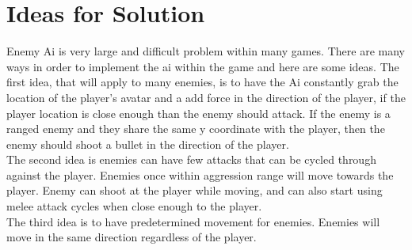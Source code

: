 \documentclass{article}
\begin{document}
	\section{Ideas for Solution}
	Enemy Ai is very large and difficult problem within many games. There are many ways in order to implement the ai within the game and here are some ideas. The first idea, that will apply to many enemies,  is to have  the Ai constantly grab the location of the player’s avatar and a add force in the direction of the player, if the player location is close enough than the enemy should attack. If the enemy is a ranged enemy and  they share the same y coordinate with the player, then the enemy should shoot a bullet in the direction of the player. \\
	The second idea is enemies can have few attacks that can be cycled through against the player. Enemies once within aggression range will move towards the player. Enemy can shoot at the player while moving, and can also start using melee attack cycles when close enough to the player.\\
	The third idea is to have predetermined movement for enemies. Enemies will move in the same direction regardless of the player. \\
\end{document}

